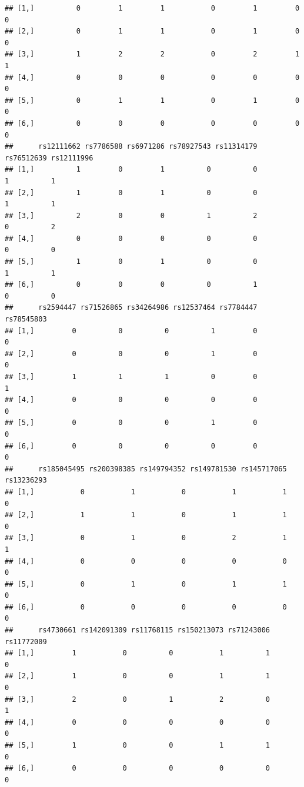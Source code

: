 \documentclass[
]{article}
\begin{document}
\begin{verbatim}
## [1,]          0         1         1           0         1         0          0
## [2,]          0         1         1           0         1         0          0
## [3,]          1         2         2           0         2         1          1
## [4,]          0         0         0           0         0         0          0
## [5,]          0         1         1           0         1         0          0
## [6,]          0         0         0           0         0         0          0
##      rs12111662 rs7786588 rs6971286 rs78927543 rs11314179 rs76512639 rs12111996
## [1,]          1         0         1          0          0          1          1
## [2,]          1         0         1          0          0          1          1
## [3,]          2         0         0          1          2          0          2
## [4,]          0         0         0          0          0          0          0
## [5,]          1         0         1          0          0          1          1
## [6,]          0         0         0          0          1          0          0
##      rs2594447 rs71526865 rs34264986 rs12537464 rs7784447 rs78545803
## [1,]         0          0          0          1         0          0
## [2,]         0          0          0          1         0          0
## [3,]         1          1          1          0         0          1
## [4,]         0          0          0          0         0          0
## [5,]         0          0          0          1         0          0
## [6,]         0          0          0          0         0          0
##      rs185045495 rs200398385 rs149794352 rs149781530 rs145717065 rs13236293
## [1,]           0           1           0           1           1          0
## [2,]           1           1           0           1           1          0
## [3,]           0           1           0           2           1          1
## [4,]           0           0           0           0           0          0
## [5,]           0           1           0           1           1          0
## [6,]           0           0           0           0           0          0
##      rs4730661 rs142091309 rs11768115 rs150213073 rs71243006 rs11772009
## [1,]         1           0          0           1          1          0
## [2,]         1           0          0           1          1          0
## [3,]         2           0          1           2          0          1
## [4,]         0           0          0           0          0          0
## [5,]         1           0          0           1          1          0
## [6,]         0           0          0           0          0          0

\end{verbatim}
\end{document}
